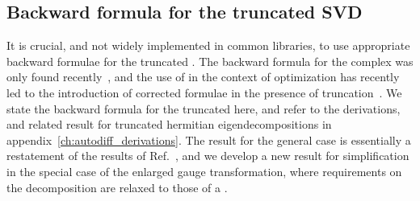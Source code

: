 \subsection{Backward formula for the truncated SVD}
\label{subsec:gradpeps:autodiff:trunc_svd}

It is crucial, and not widely implemented in common  libraries, to use appropriate backward formulae for the truncated .
%
The backward formula for the complex  was only found recently~\cite{wan2019}, and the use of  in the context of  optimization has recently led to the introduction of corrected formulae in the presence of truncation~\cite{francuz2023}.
%
We state the backward formula for the truncated  here, and refer to the derivations, and related result for truncated hermitian eigendecompositions in appendix~\ref{ch:autodiff_derivations}.
%
The result for the general case is essentially a restatement of the results of Ref.~\cite{francuz2023}, and we develop a new result for simplification in the special case of the enlarged gauge transformation, where requirements on the decomposition are relaxed to those of a .




